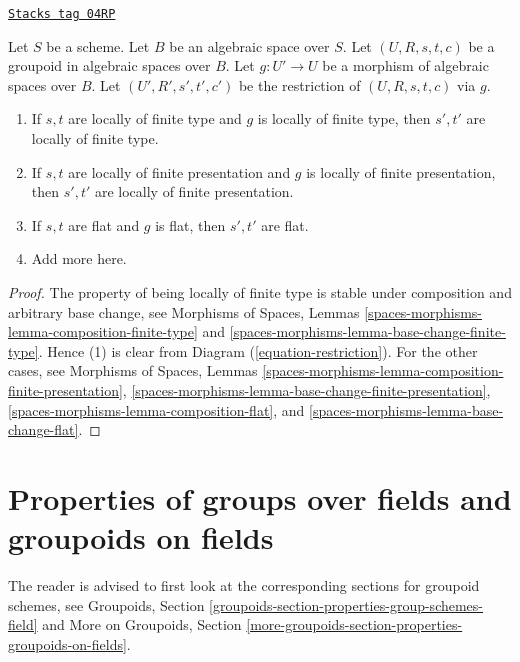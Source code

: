 \begin{lemma}
\label{spaces-more-groupoids-lemma-restrict-preserves-type}
\href{https://stacks.math.columbia.edu/tag/04RP}{\texttt{Stacks tag 04RP}}

Let $S$ be a scheme. Let $B$ be an algebraic space over $S$.
Let $(U, R, s, t, c)$ be a groupoid in algebraic spaces over $B$.
Let $g : U' \to U$ be a morphism of algebraic spaces over $B$.
Let $(U', R', s', t', c')$ be the restriction of
$(U, R, s, t, c)$ via $g$.
\begin{enumerate}
\item If $s, t$ are locally of finite type and $g$ is locally of finite
type, then $s', t'$ are locally of finite type.
\item If $s, t$ are locally of finite presentation and $g$ is locally of finite
presentation, then $s', t'$ are locally of finite presentation.
\item If $s, t$ are flat and $g$ is flat, then $s', t'$ are flat.
\item Add more here.
\end{enumerate}
\end{lemma}

\begin{proof}
The property of being locally of finite type is stable under composition
and arbitrary base change, see
Morphisms of Spaces,
Lemmas \ref{spaces-morphisms-lemma-composition-finite-type} and
\ref{spaces-morphisms-lemma-base-change-finite-type}.
Hence (1) is clear from Diagram (\ref{equation-restriction}).
For the other cases, see
Morphisms of Spaces,
Lemmas \ref{spaces-morphisms-lemma-composition-finite-presentation},
\ref{spaces-morphisms-lemma-base-change-finite-presentation},
\ref{spaces-morphisms-lemma-composition-flat}, and
\ref{spaces-morphisms-lemma-base-change-flat}.
\end{proof}

\section{Properties of groups over fields and groupoids on fields}
\label{spaces-more-groupoids-section-properties-groupoids-on-fields}
The reader is advised to first look at the corresponding sections for
groupoid schemes, see
Groupoids, Section \ref{groupoids-section-properties-group-schemes-field}
and
More on Groupoids,
Section \ref{more-groupoids-section-properties-groupoids-on-fields}.

